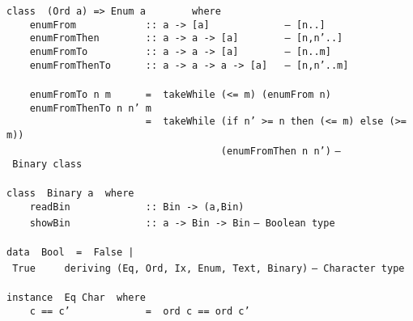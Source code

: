 %
\eprogB\noindent\bprogB
\mbox{\tt class\ \ (Ord\ a)\ =>\ Enum\ a\ \ \ \ \ \ \ \ where}\\
\mbox{\tt \ \ \ \ enumFrom\ \ \ \ \ \ \ \ \ \ \ \ ::\ a\ ->\ [a]\ \ \ \ \ \ \ \ \ \ \ \ \ --\ [n..]}\\
\mbox{\tt \ \ \ \ enumFromThen\ \ \ \ \ \ \ \ ::\ a\ ->\ a\ ->\ [a]\ \ \ \ \ \ \ \ --\ [n,n'..]}\\
\mbox{\tt \ \ \ \ enumFromTo\ \ \ \ \ \ \ \ \ \ ::\ a\ ->\ a\ ->\ [a]\ \ \ \ \ \ \ \ --\ [n..m]}\\
\mbox{\tt \ \ \ \ enumFromThenTo\ \ \ \ \ \ ::\ a\ ->\ a\ ->\ a\ ->\ [a]\ \ \ --\ [n,n'..m]}\\
\mbox{\tt }\\[-8pt]
\mbox{\tt \ \ \ \ enumFromTo\ n\ m\ \ \ \ \ \ =\ \ takeWhile\ (<=\ m)\ (enumFrom\ n)}\\
\mbox{\tt \ \ \ \ enumFromThenTo\ n\ n'\ m}\\
\mbox{\tt \ \ \ \ \ \ \ \ \ \ \ \ \ \ \ \ \ \ \ \ \ \ \ \ =\ \ takeWhile\ (if\ n'\ >=\ n\ then\ (<=\ m)\ else\ (>=\ m))}\\
\mbox{\tt \ \ \ \ \ \ \ \ \ \ \ \ \ \ \ \ \ \ \ \ \ \ \ \ \ \ \ \ \ \ \ \ \ \ \ \ \ (enumFromThen\ n\ n')}
%
%
%
%
%
%
\eprogB\noindent\bprogB
\mbox{\tt --\ Binary\ class}\\
\mbox{\tt }\\[-8pt]
\mbox{\tt class\ \ Binary\ a\ \ where}\\
\mbox{\tt \ \ \ \ readBin\ \ \ \ \ \ \ \ \ \ \ \ \ ::\ Bin\ ->\ (a,Bin)}\\
\mbox{\tt \ \ \ \ showBin\ \ \ \ \ \ \ \ \ \ \ \ \ ::\ a\ ->\ Bin\ ->\ Bin}
%
%
%
\eprogB\noindent\bprogB
\mbox{\tt --\ Boolean\ type}\\
\mbox{\tt }\\[-8pt]
\mbox{\tt data\ \ Bool\ \ =\ \ False\ |\ True\ \ \ \ \ deriving\ (Eq,\ Ord,\ Ix,\ Enum,\ Text,\ Binary)}
%
\eprogB\noindent\bprogB
\mbox{\tt --\ Character\ type}\\
\mbox{\tt }\\[-8pt]
\mbox{\tt instance\ \ Eq\ Char\ \ where}\\
\mbox{\tt \ \ \ \ c\ ==\ c'\ \ \ \ \ \ \ \ \ \ \ \ \ =\ \ ord\ c\ ==\ ord\ c'}
%
\eprogB\noindent\bprogB
